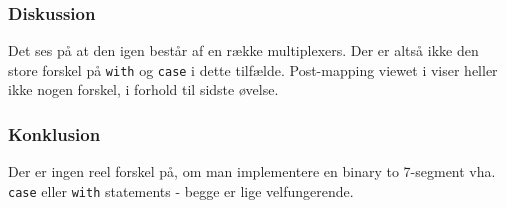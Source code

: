 {%
\subsubsection{Diskussion}

Det ses på  at den igen består af en række multiplexers. Der er altså ikke den store forskel på \texttt{with} og \texttt{case} i dette tilfælde. Post-mapping viewet i  viser heller ikke nogen forskel, i forhold til sidste øvelse.

\subsubsection{Konklusion}

Der er ingen reel forskel på, om man implementere en binary to 7-segment vha. \texttt{case} eller \texttt{with} statements - begge er lige velfungerende.
        
}